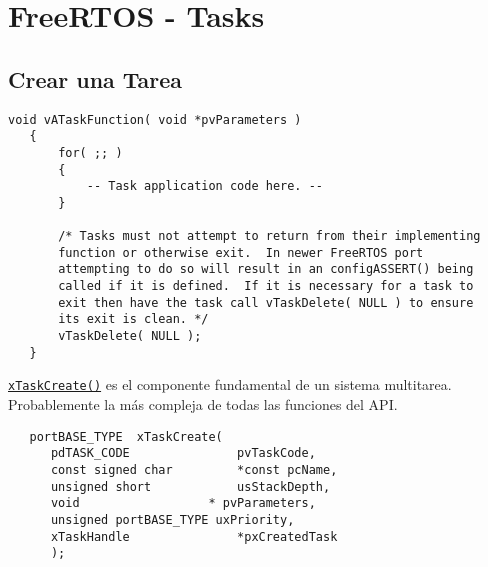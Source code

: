 \chapter{FreeRTOS - Tasks}
\lstset{language=C}
\section{Crear una Tarea}


\begin{lstlisting}[caption={Definir la funcion de tarea},label={lst:task}]
   void vATaskFunction( void *pvParameters )
   {
       for( ;; )
       {
           -- Task application code here. --
       }

       /* Tasks must not attempt to return from their implementing
       function or otherwise exit.  In newer FreeRTOS port
       attempting to do so will result in an configASSERT() being
       called if it is defined.  If it is necessary for a task to
       exit then have the task call vTaskDelete( NULL ) to ensure
       its exit is clean. */
       vTaskDelete( NULL );
   }
\end{lstlisting}

\href{http://www.freertos.org/a00125.html}{\texttt{xTaskCreate()}}
es el componente fundamental de un sistema multitarea.
Probablemente la más compleja de todas las funciones del API.

\begin{lstlisting}
   portBASE_TYPE  xTaskCreate(
      pdTASK_CODE       		pvTaskCode,
      const signed char 		*const pcName,
      unsigned short    		usStackDepth,
      void 	          		* pvParameters,
      unsigned portBASE_TYPE uxPriority,
      xTaskHandle       		*pxCreatedTask
      );
      
\end{lstlisting}

